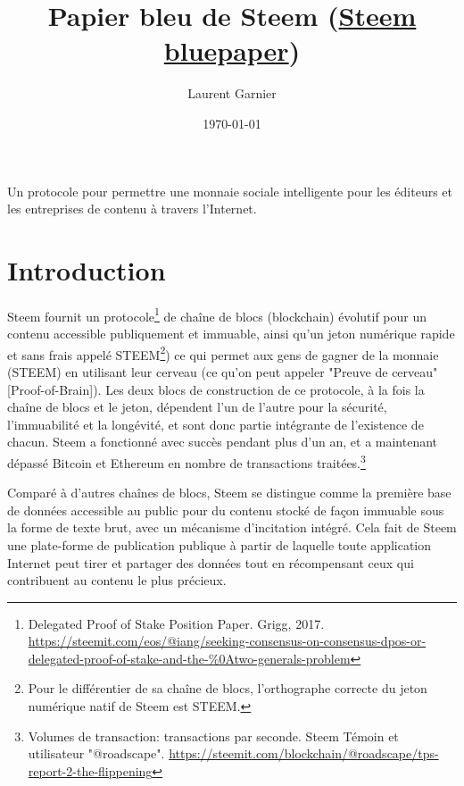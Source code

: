 \documentclass[11pt]{article}
\author{Laurent Garnier}
\date{\today}
\title{Papier bleu de Steem (\href{https://steem.io/steem-bluepaper.pdf}{Steem bluepaper})}
\begin{document}
\maketitle
\tableofcontents

Un protocole pour permettre une monnaie sociale intelligente pour les
éditeurs et les entreprises de contenu à travers l'Internet.

\section{Introduction}
\label{sec:orgd80601b}
Steem fournit un protocole\footnote{Delegated Proof of Stake Position
Paper. Grigg, 2017. \url{https://steemit.com/eos/@iang/seeking-consensus-on-consensus-dpos-or-delegated-proof-of-stake-and-the-\%0Atwo-generals-problem}} de chaîne de blocs (blockchain)
évolutif pour un contenu accessible publiquement et immuable, ainsi
qu'un jeton numérique rapide et sans frais appelé STEEM\footnote{Pour le différentier de sa chaîne de blocs, l'orthographe
correcte du jeton numérique natif de Steem est STEEM.}) ce
qui permet aux gens de gagner de la monnaie (STEEM) en utilisant
leur cerveau (ce qu'on peut appeler "Preuve de cerveau"
[Proof-of-Brain]). Les deux blocs de construction de ce protocole, à
la fois la chaîne de blocs et le jeton, dépendent l'un de l'autre
pour la sécurité, l'immuabilité et la longévité, et sont donc partie
intégrante de l'existence de chacun. Steem a fonctionné avec succès
pendant plus d'un an, et a maintenant dépassé Bitcoin et Ethereum en
nombre de transactions traitées.\footnote{Volumes de transaction: transactions par seconde. Steem Témoin
et utilisateur
"@roadscape". \url{https://steemit.com/blockchain/@roadscape/tps-report-2-the-flippening}}

Comparé à d'autres chaînes de blocs, Steem se distingue comme la première
base de données accessible au public pour du contenu stocké de façon
immuable sous la forme de texte brut, avec un mécanisme d'incitation
intégré. Cela fait de Steem une plate-forme de publication publique
à partir de laquelle toute application Internet peut tirer et
partager des données tout en récompensant ceux qui contribuent au
contenu le plus précieux. 
\end{document}
